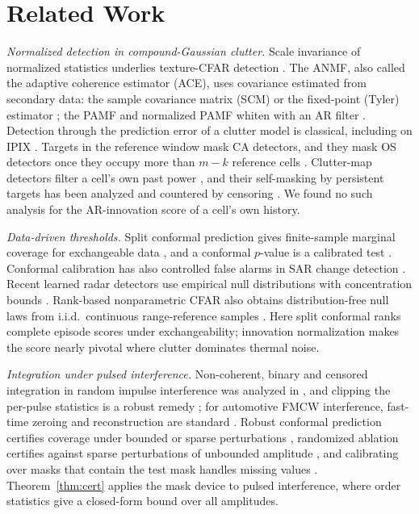 \documentclass[journal]{IEEEtran}
\begin{document}
\section{Related Work}\label{sec:related}
\emph{Normalized detection in compound-Gaussian clutter.} Scale invariance of normalized statistics underlies texture-CFAR detection \cite{conte1995,kraut1999,ollila2012}. The ANMF, also called the adaptive coherence estimator (ACE), uses covariance estimated from secondary data: the sample covariance matrix (SCM) \cite{kraut1999} or the fixed-point (Tyler) estimator \cite{pascal2008fp}; the PAMF and normalized PAMF whiten with an AR filter \cite{roman2000,michels2000}. Detection through the prediction error of a clutter model is classical, including on IPIX \cite{haykin1995}. Targets in the reference window mask CA detectors, and they mask OS detectors once they occupy more than $m-k$ reference cells \cite{rohling1983,gandhi1988}. Clutter-map detectors filter a cell's own past power \cite{lops1989}, and their self-masking by persistent targets has been analyzed and countered by censoring \cite{naldi1999}. We found no such analysis for the AR-innovation score of a cell's own history.

\emph{Data-driven thresholds.} Split conformal prediction gives finite-sample marginal coverage for exchangeable data \cite{lei2018,vovk2012}, and a conformal $p$-value is a calibrated test \cite{bates2023}. Conformal calibration has also controlled false alarms in SAR change detection \cite{bultingaire2024sar}. Recent learned radar detectors use empirical null distributions with concentration bounds \cite{rouzoumka2026ood}. Rank-based nonparametric CFAR also obtains distribution-free null laws from i.i.d.\ continuous range-reference samples \cite{meng2026rank}. Here split conformal ranks complete episode scores under exchangeability; innovation normalization makes the score nearly pivotal where clutter dominates thermal noise.

\emph{Integration under pulsed interference.} Non-coherent, binary and censored integration in random impulse interference was analyzed in \cite{himonas1994api}, and clipping the per-pulse statistics is a robust remedy \cite{abbasi2018clip}; for automotive FMCW interference, fast-time zeroing and reconstruction are standard \cite{toth2019comp,rameez2021ar}. Robust conformal prediction certifies coverage under bounded or sparse perturbations \cite{gendler2022arcp,zargarbashi2024robust}, randomized ablation certifies against sparse perturbations of unbounded amplitude \cite{levine2020ablation}, and calibrating over masks that contain the test mask handles missing values \cite{zaffran2023missing}. Theorem~\ref{thm:cert} applies the mask device to pulsed interference, where order statistics give a closed-form bound over all amplitudes.
\end{document}
